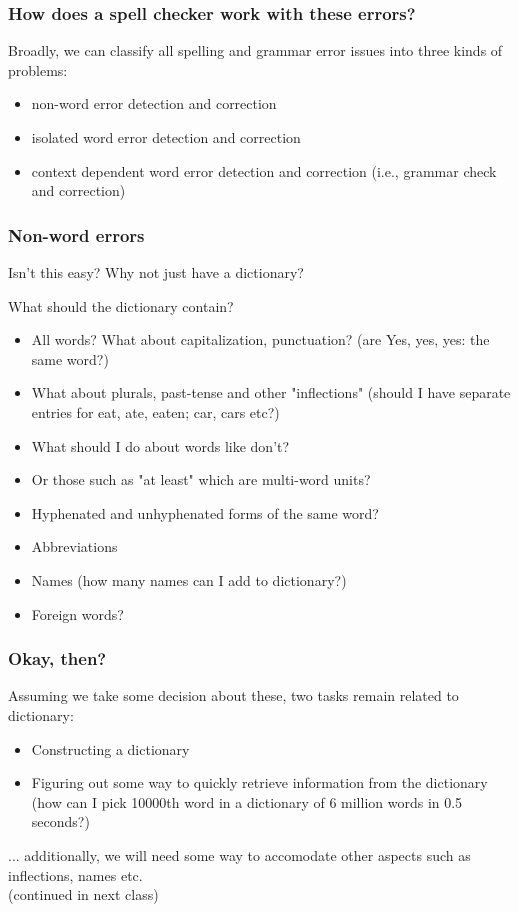 \documentclass{beamer}
\begin{document}
\begin{frame}
\frametitle{How does a spell checker work with these errors?}
Broadly, we can classify all spelling and grammar error issues into three kinds of problems:
\begin{itemize}
\item non-word error detection and correction
\item isolated word error detection and correction
\item context dependent word error detection and correction (i.e., grammar check and correction)
\end{itemize}
\end{frame}

\begin{frame}
\frametitle{Non-word errors}
Isn't this easy? Why not just have a dictionary? \pause

What should the dictionary contain?
\begin{itemize}
\item All words? What about capitalization, punctuation? (are Yes, yes, yes: the same word?) \pause
\item What about plurals, past-tense and other "inflections" (should I have separate entries for eat, ate, eaten; car, cars etc?) \pause
\item What should I do about words like don't? \pause
\item Or those such as "at least" which are multi-word units? \pause
\item Hyphenated and unhyphenated forms of the same word? \pause
\item Abbreviations
\item Names (how many names can I add to dictionary?)
\item Foreign words? 
\end{itemize}
\end{frame}

\begin{frame}
\frametitle{Okay, then?}
Assuming we take some decision about these, two tasks remain related to dictionary:
\begin{itemize}
\item Constructing a dictionary
\item Figuring out some way to quickly retrieve information from the dictionary (how can I pick 10000th word in a dictionary of 6 million words in 0.5 seconds?)
\end{itemize} \pause
... additionally, we will need some way to accomodate other aspects such as inflections, names etc. \\
 \medskip \small (continued in next class)
\end{frame}
\end{document}
